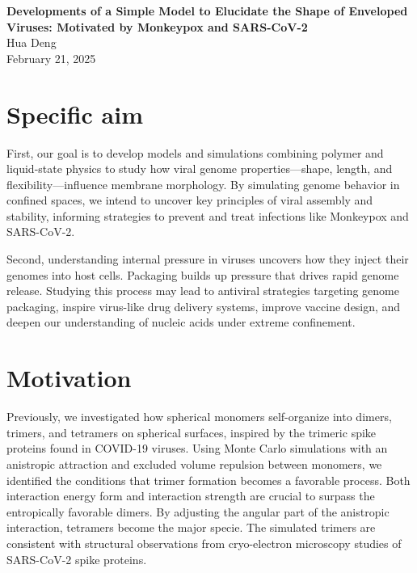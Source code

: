 \documentclass[12pt]{article}
\begin{document}
\doublespacing

\begin{center}
{\Large \textbf{Developments of a Simple Model to Elucidate the Shape of Enveloped Viruses: Motivated by Monkeypox and SARS-CoV-2}}\\[1.5ex]
{\normalsize  Hua Deng}\\

{\normalsize February 21, 2025}
\end{center}





\begin{flushleft}
\setlength{\parindent}{30pt}
\section*{Specific aim}


First, our goal is to develop models and simulations combining polymer and liquid-state physics to study how viral genome properties—shape, length, and flexibility—influence membrane morphology. By simulating genome behavior in confined spaces, we intend to uncover key principles of viral assembly and stability, informing strategies to prevent and treat infections like Monkeypox and SARS-CoV-2.

Second, understanding internal pressure in viruses uncovers how they inject their genomes into host cells. Packaging builds up pressure that drives rapid genome release. Studying this process may lead to antiviral strategies targeting genome packaging, inspire virus-like drug delivery systems, improve vaccine design, and deepen our understanding of nucleic acids under extreme confinement.
\vspace{-1em} 
\section*{Motivation}

Previously, we investigated how spherical monomers self-organize into dimers, trimers, and tetramers on spherical surfaces, inspired by the trimeric spike proteins found in COVID-19 viruses. Using Monte Carlo simulations with an anistropic attraction and excluded volume repulsion between monomers, we identified the conditions that trimer formation becomes a favorable process. Both interaction energy form and interaction strength are crucial to surpass the entropically favorable dimers.  By adjusting the angular part of the anistropic interaction, tetramers become the major specie. The simulated trimers are consistent with structural observations from cryo-electron microscopy studies of SARS-CoV-2 spike proteins\cite{Ke2020}. 



\end{flushleft}
\end{document}

